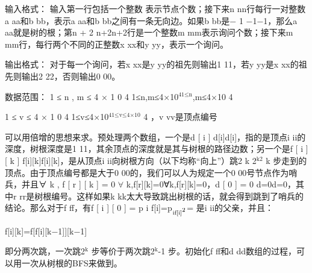 \documentclass[9pt, b5paaper]{book}
\begin{document}
输入格式：
输入第一行包括一个整数 表示节点个数；接下来n nn行每行一对整数a aa和b bb，表示a aa和b bb之间有一条无向边。如果b bb是− 1 −1−1，那么a aa就是树的根；第n + 2 n+2n+2行是一个整数m mm表示询问个数；接下来m mm行，每行两个不同的正整数x xx和y yy，表示一个询问。

输出格式：
对于每一个询问，若x xx是y yy的祖先则输出1 11，若y yy是x xx的祖先则输出2 22，否则输出0 00。

数据范围：
1 ≤ n , m ≤ 4 × 1 0 4 1≤n,m≤4×10$^{\text{41≤n}}$,m≤4×10 
4

1 ≤ v ≤ 4 × 1 0 4 1≤v≤4×10$^{\text{41≤v≤4×10}}$ 
4
 ，v vv是顶点编号

可以用倍增的思想来求。预处理两个数组，一个是d [ i ] d[i]d[i]，指的是顶点i ii的深度，树根深度是1 11，其余顶点的深度就是其与树根的路径边数；另一个是f [ i ] [ k ] f[i][k]f[i][k]，是从顶点i ii向树根方向（以下均称“向上”）跳2 k 2$^{\text{k2}}$ 
k
 步走到的顶点。由于顶点编号都是大于0 00的，我们可以人为规定一个0 00号节点作为哨兵，并且∀ k , f [ r ] [ k ] = 0 $\forall$ k,f[r][k]=0∀k,f[r][k]=0，d [ 0 ] = 0 d\footnotemark[2]{}=0d\footnotemark[2]{}=0，其中r rr是树根编号。这样如果k kk太大导致跳出树根的话，就会得到跳到了哨兵的结论。那么对于f ff，有f [ i ] [ 0 ] = p i f[i]\footnotemark[2]{}=p$_{\text{if[i]}\footnotemark[2]{}}$= 是i ii的父亲，并且：

f[i][k]=f[f[i][k−1]][k−1]

即分两次跳，一次跳2$^{\text{k}}$ 步等价于两次跳2$^{\text{k}}$-1 步。初始化f ff和d dd数组的过程，可以用一次从树根的BFS来做到。
\end{document}
